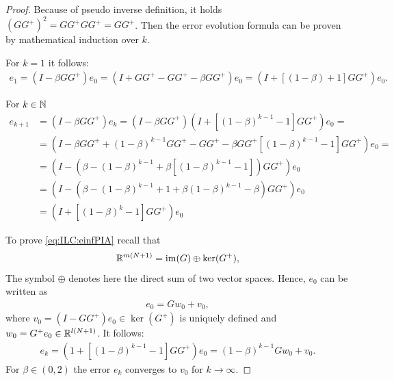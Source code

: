 \begin{proof}
	
	Because of pseudo inverse definition, it holds
	$(GG^+)^2 = GG^+GG^+ = GG^+$.  Then the error evolution formula can be proven by mathematical induction over $k$. 
	
	For $k = 1$ it follows: 
	\begin{align*}
	e_1 = (I - \beta G G^+)e_0 = (I + GG^+ - GG^+ - \beta G G^+)e_0 = (I + \left[(1 - \beta) + 1\right]GG^+)e_0.
	\end{align*}
	
	For $k \in {\mathbb{N}}$  
	\begin{align*}
	e_{k+1} &= ( I - \beta G G^+)e_k = ( I - \beta G G^+) (I+  \left[(1-\beta)^{k-1} - 1\right] G G^+) e_0 = \\
	& = \left(I - \beta G G^+ + (1-\beta)^{k-1}GG^+ - GG^+ - \beta GG^+\left[(1 - \beta)^{k-1} - 1\right]GG^+\right)e_0=\\
	& = \left(I - (\beta - (1-\beta)^{k-1} + \beta\left[(1 - \beta)^{k-1} - 1\right])G G^+\right)e_0\\
	& = \left(I - \left(\beta - (1-\beta)^{k-1} + 1 + \beta(1-\beta)^{k-1} - \beta\right)GG^+\right)e_0\\
	& = (I+  \left[(1-\beta)^k - 1\right] G G^+) e_0
	\end{align*}
	
	To prove \eqref{eq:ILC:einfPIA}  recall that 
	\begin{align*}
	{\mathbb{R}}^{m(N+1)} = \operatorname{im}(G)\oplus \ker (G^+),
	\end{align*}
	The symbol $\oplus$ denotes here the direct sum of two vector spaces. %
	Hence, $e_0$ can be written as 
	\begin{align*}  
	e_0 = G w_0 + v_0,
	\end{align*}
	where $v_0 = (I - G G^+)e_0 \in \ker (G^+)$  is uniquely defined and $w_0 = G^+ e_0 \in {\mathbb{R}}^{l(N+1)}$. It follows: 
	\begin{align*}
	e_{k} = (1+ \left[(1 - \beta)^{k-1} - 1\right]GG^+)e_0 = (1-\beta)^{k-1} G w_0 + v_0.
	\end{align*}
	For $\beta \in (0,2)$ the error $e_k$ converges to $v_0$ for $k \to \infty$. 
\end{proof}

